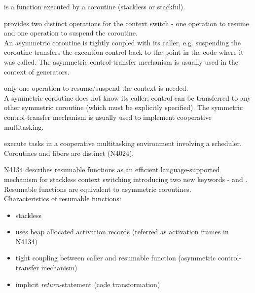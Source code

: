 is a function executed by a coroutine (stackless or stackful).

provides two distinct operations for the context switch - one operation to
resume and one operation to suspend the coroutine.\\
An asymmetric coroutine is tightly coupled with its caller, e.g. suspending the
coroutine transfers the execution control back to the point in the code where it
was called. The asymmetric control-transfer mechanism is usually used in the
context of generators.

only one operation to resume/suspend the context is needed.\\
A symmetric coroutine does not know its caller; control can
be transferred to any other symmetric coroutine (which must be explicitly specified).
The symmetric control-transfer mechanism is usually used to implement
cooperative multitasking.

execute tasks in a cooperative multitasking environment involving a scheduler.
Coroutines and fibers are distinct (N4024\cite{N4024}).

N4134\cite{N4134} describes resumable functions as an efficient 
language-supported mechanism for stackless context switching introducing two new keywords
- \await and \yield. Resumable functions are equivalent to asymmetric
coroutines.\\
Characteristics of resumable functions:
\begin{itemize}
    \item stackless
    \item uses heap allocated activation records (referred as activation frames
          in N4134)
    \item tight coupling between caller and resumable function (asymmetric
          control-transfer mechanism)
    \item implicit \emph{return}-statement\cite{N4134} (code transformation)
\end{itemize}
